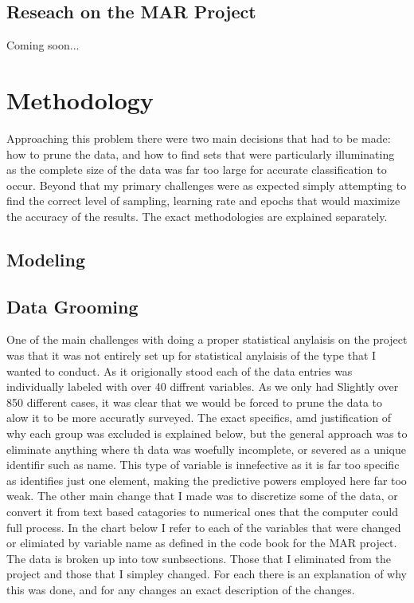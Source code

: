 \documentclass[12pt]{article}
\begin{document}
\subsection{Reseach on the MAR Project}
Coming soon...



\section{Methodology}
Approaching this problem there were two main decisions that had to be made: how to prune the data, and how to find sets that were particularly illuminating as  the complete size of the data was far too large for accurate classification to occur. Beyond that my primary challenges were as expected simply attempting to find the correct level of sampling, learning rate and epochs that would maximize the accuracy of the results. The exact methodologies are explained separately.

\subsection{Modeling}

\subsection{Data Grooming}
One of the main challenges with doing a proper statistical anylaisis on the project was that it was not entirely set up for statistical anylaisis of the type that I wanted to conduct. As it origionally stood each of the data entries was individually labeled with over 40 diffrent variables. As we only had Slightly over 850 different cases, it was clear that we would be forced to prune the data to alow it to be more accuratly surveyed. The exact specifics, amd justification of why each group was excluded is explained below, but the general approach was to eliminate anything where th data was woefully incomplete, or severed as a unique identifir such as name. This type of variable is innefective as it is far too specific as identifies just one element, making the predictive powers employed here far too weak. The other main change that I made was to discretize some of the data, or convert it from text based catagories to numerical ones that the computer could full process. In the chart below I refer to each of the variables that were changed or elimiated by variable name as defined in the code book for the MAR project. The data is broken up into tow sunbsections. Those that I eliminated from the project and those that I simpley changed. For each there is an explanation of why this was done, and for any changes an exact description of the changes. 
\end{document}
